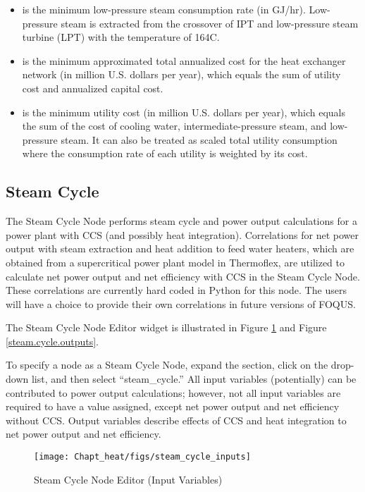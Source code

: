 \begin{itemize}
	\item {} is the minimum low-pressure steam consumption rate (in GJ/hr). Low-pressure steam is extracted from the crossover of IPT and low-pressure steam turbine (LPT) with the temperature of 164\degree C.
	\item {} is the minimum approximated total annualized cost for the heat exchanger network (in million U.S. dollars per year), which equals the sum of utility cost and annualized capital cost.
	\item {} is the minimum utility cost (in million U.S. dollars per year), which equals the sum of the cost of cooling water, intermediate-pressure steam, and low-pressure steam. It can also be treated as scaled total utility consumption where the consumption rate of each utility is weighted by its cost.
\end{itemize}

\subsection{Steam Cycle}

The Steam Cycle Node performs steam cycle and power output calculations for a power plant with CCS (and possibly heat integration). Correlations for net power output with steam extraction and heat addition to feed water heaters, which are obtained from a supercritical power plant model in Thermoflex, are utilized to calculate net power output and net efficiency with CCS in the Steam Cycle Node. These correlations are currently hard coded in Python for this node. The users will have a choice to provide their own correlations in future versions of FOQUS. 

The Steam Cycle Node Editor widget is illustrated in Figure \ref{steam.cycle.inputs} and Figure \ref{steam.cycle.outputs}. 

To specify a node as a Steam Cycle Node, expand the  section, click on the  drop-down list, and then select ``steam\_cycle.'' All input variables (potentially) can be contributed to power output calculations; however, not all input variables are required to have a value assigned, except net power output and net efficiency without CCS. Output variables describe effects of CCS and heat integration to net power output and net efficiency.

\begin{figure}[H]
	\begin{center}
		\texttt{[image: Chapt\_heat/figs/steam\_cycle\_inputs]}
		\caption{Steam Cycle Node Editor (Input Variables)}
		\label{steam.cycle.inputs}
	\end{center}
\end{figure}

